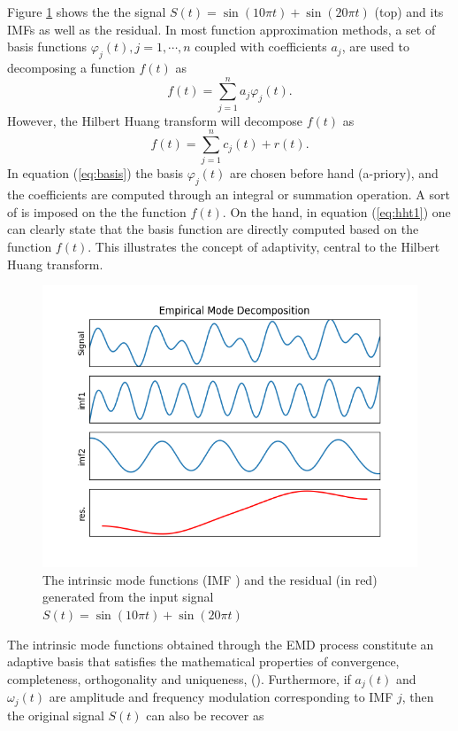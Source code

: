 \documentclass[../Main/thesis.tex]{subfiles}
\begin{document}
Figure \ref{fig:emd3} shows the the signal  $S(t) = \sin(10 \pi t) + \sin(20 \pi t) $ (top) and its IMFs as well as the residual. In most function approximation methods, a set of basis functions $\varphi_{j}(t), j = 1,\cdots,n$ coupled with coefficients $a_{j}$, are used to decomposing a function $f(t)$ as 
\begin{equation}\label{eq:basis}
	f(t) = \sum_{j=1}^{n}a_{j}\varphi_{j}(t).
\end{equation}
However, the Hilbert Huang transform will decompose $f(t)$ as 
\begin{equation}\label{eq:hht1}
f(t) = \sum_{j=1}^{n}c_{j}(t) + r(t).
\end{equation}
In equation (\ref{eq:basis}) the basis $\varphi_{j}(t)$ are chosen before hand (a-priory), and the coefficients are computed through an integral or summation operation. A sort of  is imposed on the the function $f(t)$. On the hand, in equation (\ref{eq:hht1}) one can clearly state that the basis function are directly computed based on the function $f(t)$. This illustrates the concept of adaptivity, central to the Hilbert Huang transform.
\begin{figure}[H] %
   \centering
   \includegraphics[width=6in]{../fig/imfEMD.png} 
   \caption{The intrinsic mode functions (IMF ) and the residual (in red) generated from the input signal $S(t) = \sin(10 \pi t) + \sin(20 \pi t) $}
   \label{fig:emd3}
\end{figure}
\justify
The intrinsic mode functions obtained through the EMD process constitute an adaptive basis that satisfies the mathematical properties of convergence, completeness, orthogonality and uniqueness, (\cite{huang98}). Furthermore, if $a_{j}(t)$ and $\omega_{j}(t)$ are amplitude and frequency modulation corresponding to IMF $j$, then the original signal $S(t)$ can also be recover as 
\end{document}
